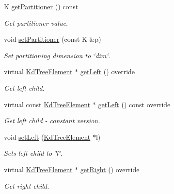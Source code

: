\begin{DoxyCompactItemize}
K \hyperlink{classbridges_1_1datastructure_1_1_kd_tree_element_a6b284e9ba808f70e163977ee1e35ba86}{get\+Partitioner} () const
\begin{DoxyCompactList}\small\item\em Get partitioner value. \end{DoxyCompactList}\item 
void \hyperlink{classbridges_1_1datastructure_1_1_kd_tree_element_a4b16d09eaad8da023bb48ead6f3dcfad}{set\+Partitioner} (const K \&p)
\begin{DoxyCompactList}\small\item\em Set partitioning dimension to \char`\"{}dim\char`\"{}. \end{DoxyCompactList}\item 
virtual \hyperlink{classbridges_1_1datastructure_1_1_kd_tree_element}{Kd\+Tree\+Element} $\ast$ \hyperlink{classbridges_1_1datastructure_1_1_kd_tree_element_a875bfa2dfd88a7740f7bcd28a117c12a}{get\+Left} () override
\begin{DoxyCompactList}\small\item\em Get left child. \end{DoxyCompactList}\item 
virtual const \hyperlink{classbridges_1_1datastructure_1_1_kd_tree_element}{Kd\+Tree\+Element} $\ast$ \hyperlink{classbridges_1_1datastructure_1_1_kd_tree_element_a653597918fbc6e31b84fcf8dbdf67122}{get\+Left} () const override
\begin{DoxyCompactList}\small\item\em Get left child -\/ constant version. \end{DoxyCompactList}\item 
void \hyperlink{classbridges_1_1datastructure_1_1_kd_tree_element_a2ca1571186e00b69f73f324bc4c20753}{set\+Left} (\hyperlink{classbridges_1_1datastructure_1_1_kd_tree_element}{Kd\+Tree\+Element} $\ast$l)
\begin{DoxyCompactList}\small\item\em Sets left child to \char`\"{}l\char`\"{}. \end{DoxyCompactList}\item 
virtual \hyperlink{classbridges_1_1datastructure_1_1_kd_tree_element}{Kd\+Tree\+Element} $\ast$ \hyperlink{classbridges_1_1datastructure_1_1_kd_tree_element_a366e3b0987169220d3a145043be2373d}{get\+Right} () override
\begin{DoxyCompactList}\small\item\em Get right child. \end{DoxyCompactList}\item 

\end{DoxyCompactItemize}
